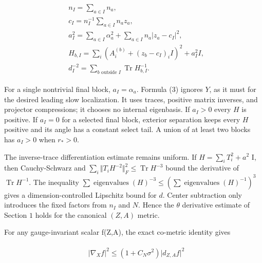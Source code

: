 \begin{gather*}
\begin{aligned}
& n_{I}=\sum _{a \in  I}n_{a}, \\
& c_{I}=n_{I}^{-1}\sum _{a \in  I}n_{a} z_{a}, \\
& a_{I}^{2}=\sum _{a \in  I}\alpha _{a}^{2} + \sum _{a \in  I}n_{a}\vert z_{a}-c_{I}\vert ^{2}, \\
& H_{b,I}=\sum _{i}(A_{i}^{(b)}+(z_{b}-c_{I})_{i} I)^{2}+a_{I}^{2} I, \\
& d_{I}^{-2}=\sum _{b \text{ outside } I}\operatorname{Tr}  H_{b,I}^{-1}.
\end{aligned}\tag{3}
\end{gather*}

For a single nontrivial final block, \(a_{I}=\alpha _{a}\). Formula (3)
ignores \(Y\), as it must for the desired leading slow localization. It
uses traces, positive matrix inverses, and projector compressions; it
chooses no internal eigenbasis. If \(a_{I}>0\) every \(H\) is positive.
If \(a_{I}=0\) for a selected final block, exterior separation keeps
every \(H\) positive and its angle has a constant select tail. A union
of at least two blocks has \(a_{I}>0\) when \(r_{*}>0\).

The inverse-trace differentiation estimate remains uniform. If
\(H=\sum _{i} T_{i}^{2}+a^{2}\) I, then Cauchy-Schwarz and
\(\sum _{i}\Vert T_{i} H^{-2}\Vert _{F}^{2}\le \operatorname{Tr}  H^{-3}\)
bound the derivative of \(\operatorname{Tr}  H^{-1}\). The inequality
\(\sum  \operatorname{eigenvalues} (H)^{-3}\le (\sum  \operatorname{eigenvalues} (H)^{-1})^{3}\)
gives a dimension-controlled Lipschitz bound for \(d\). Center
subtraction only introduces the fixed factors from \(n_{I}\) and \(N\).
Hence the \(\theta\) derivative estimate of Section \(1\) holds for the
canonical \((Z,A)\) metric.

For any gauge-invariant scalar f(Z,A), the exact co-metric identity
gives

\begin{gather*}
\begin{aligned}
& \vert \nabla _{X} f\vert ^{2} \le  (1+C_{N} \sigma ^{2})\vert d_{Z,A}f\vert ^{2}
\end{aligned}\tag{4}
\end{gather*}

